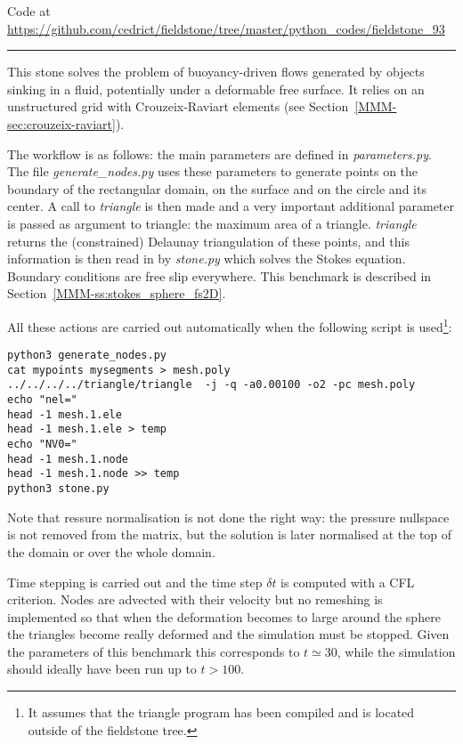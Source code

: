 

\begin{center}
Code at \url{https://github.com/cedrict/fieldstone/tree/master/python_codes/fieldstone_93}
\end{center}

\par\noindent\rule{\textwidth}{0.4pt}



This stone solves the problem of buoyancy-driven flows generated 
by objects sinking in a fluid, potentially under a deformable free surface.
It relies on an unstructured grid with Crouzeix-Raviart elements 
(see Section~\ref{MMM-sec:crouzeix-raviart}).

The workflow is as follows: the main parameters are defined in {\sl parameters.py}.
The file {\sl generate\_nodes.py} uses these parameters to generate points on the 
boundary of the rectangular domain, on the surface and on the circle and its center. 
A call to {\sl triangle} is then made and a very important additional parameter is passed
as argument to triangle: the maximum area of a triangle. 
{\sl triangle} returns the (constrained) Delaunay triangulation of these points, 
and this information is then read in by {\sl stone.py} which solves the 
Stokes equation. 
Boundary conditions are free slip everywhere. This benchmark is described in 
Section~\ref{MMM-ss:stokes_sphere_fs2D}.

All these actions are carried out automatically when the following script is 
used\footnote{It assumes that the triangle program has been compiled and 
is located outside of the fieldstone tree.}:
\begin{lstlisting}
python3 generate_nodes.py
cat mypoints mysegments > mesh.poly
../../../../triangle/triangle  -j -q -a0.00100 -o2 -pc mesh.poly
echo "nel="
head -1 mesh.1.ele 
head -1 mesh.1.ele > temp
echo "NV0="
head -1 mesh.1.node 
head -1 mesh.1.node >> temp
python3 stone.py
\end{lstlisting}


Note that ressure normalisation is not done the right way: the pressure nullspace is 
not removed from the matrix, but the solution is later normalised at the top
of the domain or over the whole domain.

Time stepping is carried out and the time step $\delta t$ is computed with a CFL criterion.
Nodes are advected with their velocity but no remeshing is implemented so that when the 
deformation becomes to large around the sphere the triangles become really deformed and 
the simulation must be stopped. Given the parameters of this benchmark this corresponds 
to $t\simeq 30$, while the simulation should ideally have been run up to $t>100$.

